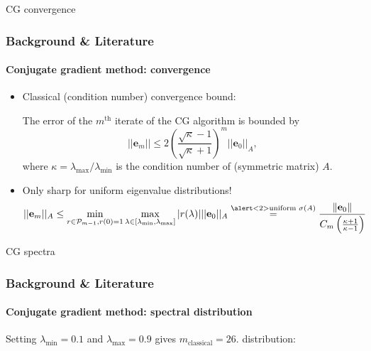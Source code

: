 \begin{frame}[label=background,fragile]{CG convergence}
    \frametitle{Background \& Literature}
    \framesubtitle{Conjugate gradient method: convergence}
    \begin{itemize}
        \item<1-> Classical (condition number) convergence bound:
        \begin{theorem}
            The error of the $m^{\text{th}}$ iterate of the CG algorithm is bounded by
            \begin{equation*}
            ||\mathbf{e}_m|| \leq 2 \left(\frac{\sqrt{\kappa}-1}{\sqrt{\kappa} + 1}\right)^m ||\mathbf{e}_0||_A,
            \end{equation*}
            where $\kappa = \lambda_{\text{max}}/\lambda_{\text{min}}$ is the condition number of (symmetric matrix) $A$.
        \end{theorem}
        \item<2-> Only sharp for \alert<2>{uniform} eigenvalue distributions!
        \begin{equation*}
            ||\mathbf{e}_m||_A \leq \min_{r \in \mathcal{P}_{m-1}, r(0) = 1} \max_{\lambda \in [\lambda_{\text{min}}, \lambda_{\text{max}}]} |r(\lambda)| ||\mathbf{e}_0||_A \overset{\alert<2>{\text{uniform } \sigma(A)}}{=} \frac{\|\mathbf{e}_0\|}{C_m\left(\frac{\kappa + 1}{\kappa - 1}\right)}
        \end{equation*}
    \end{itemize}
\end{frame}

\begin{frame}[label=background,fragile]{CG spectra}
    \frametitle{Background \& Literature}
    \framesubtitle{Conjugate gradient method: spectral distribution}
    Setting $\lambda_{\text{min}} = 0.1$ and $\lambda_{\text{max}} = 0.9$ gives $m_{\text{classical}} = 26$.  distribution:
\end{frame}

